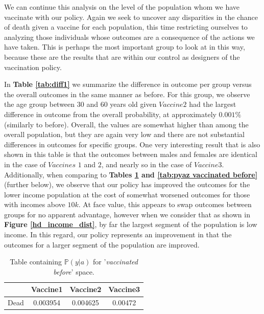 \documentclass{article}
\begin{document}
We can continue this analysis on the level of the population whom we have vaccinate with our policy. Again we seek to uncover any disparities in the chance of death given a vaccine for each population, this time restricting ourselves to analyzing those individuals whose outcomes are a consequence of the actions we have taken. This is perhaps the most important group to look at in this way, because these are the results that are within our control as designers of the vaccination policy.

In \textbf{Table \ref{tab:diff1}} we summarize the difference in outcome per group versus the overall outcomes in the same manner as before. For this group, we observe the age group between $30$ and $60$ years old given $Vaccine2$ had the largest difference in outcome from the overall probability, at approximately $0.001\%$ (similarly to before). Overall, the values are somewhat higher than among the overall population, but they are again very low and there are not substantial differences in outcomes for specific groups. One very interesting result that is also shown in this table is that the outcomes between males and females are identical in the case of $Vaccines$ $1$ and $2$, and nearly so in the case of $Vaccine3$. Additionally, when comparing to \textbf{Tables \ref{tab:pya vaccinated before} and \ref{tab:pyaz vaccinated before}} (further below), we observe that our policy has improved the outcomes for the lower income population at the cost of somewhat worsened outcomes for those with incomes above $10k$. At face value, this appears to swap outcomes between groups for no apparent advantage, however when we consider that as shown in \textbf{Figure \ref{hd_income_dist}}, by far the largest segment of the population is low income. In this regard, our policy represents an improvement in that the outcomes for a larger segment of the population are improved.

\begin{center}
    \begin{table}[H]
    \centering
        \begin{tabular}{ |c| c c c|}
            \hline
            & Vaccine1 &  Vaccine2 & Vaccine3  \\
            \hline
            Dead &  0.003954 &  0.004625 &   0.00472
            \\ \hline
        \end{tabular}
    \caption{Table containing $\mathbb{P}(y | a)$ for '\textit{vaccinated before}' space.}
    \label{tab:pya vaccinated before}
    \end{table}
\end{center}
\end{document}
